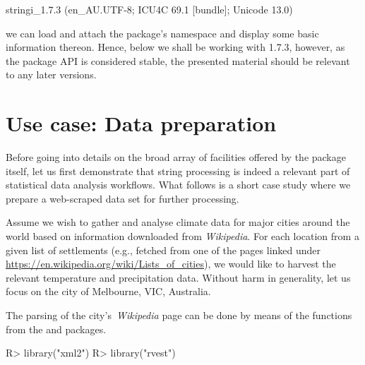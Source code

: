 \documentclass[nojss]{jss}
\begin{document}
\begin{Schunk}
\begin{Soutput}
stringi_1.7.3 (en_AU.UTF-8; ICU4C 69.1 [bundle]; Unicode 13.0)
\end{Soutput}
\end{Schunk}


\noindent
we can load and attach the package's namespace
and display some basic information thereon.
Hence, below we shall be working with
 1.7.3, however, as the package
API is considered stable, the presented material should be relevant to
any later versions.




\section{Use case: Data preparation}\label{Sec:examples}

Before going into details on the broad array of facilities offered by the
 package itself,
let us first demonstrate that string processing is indeed a relevant
part of statistical data analysis workflows.
What follows is a short case study where we prepare a web-scraped
data set for further processing.

Assume we wish to gather and analyse
climate data for major cities around the world based on information
downloaded from \textit{Wikipedia}.
For each location from a given list of settlements (e.g.,
fetched from one of the pages linked under
\url{https://en.wikipedia.org/wiki/Lists_of_cities}),
we would like to harvest the relevant temperature and precipitation data.
Without harm in generality, let us focus on the city of Melbourne,
VIC, Australia.

The parsing of the city's~\textit{Wikipedia} page
can be done by means of the functions from the
 \citep{xml2}
and  \citep{rvest} packages.

\begin{Schunk}
\begin{Sinput}
R> library("xml2")
R> library("rvest")
\end{Sinput}
\end{Schunk}
\end{document}

